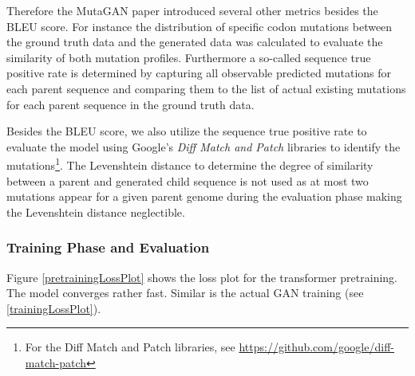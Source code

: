 Therefore the MutaGAN paper \cite{Berman2020} introduced several other metrics besides the \ac{BLEU} score. For instance the distribution of specific codon mutations between the ground truth data and the generated data was calculated to evaluate the similarity of both mutation profiles. Furthermore a so-called sequence true positive rate is determined by capturing all observable predicted mutations for each parent sequence and comparing them to the list of actual existing mutations for each parent sequence in the ground truth data. 

Besides the \ac{BLEU} score, we also utilize the sequence true positive rate to evaluate the model using Google's \textit{Diff Match and Patch} libraries to identify the mutations\footnote{For the Diff Match and Patch libraries, see \url{https://github.com/google/diff-match-patch}}. The Levenshtein distance to determine the degree of similarity between a parent and generated child sequence is not used as at most two mutations appear for a given parent genome during the evaluation phase making the Levenshtein distance neglectible. 

\subsubsection{Training Phase and Evaluation} \label{ch:experimentsBb}

Figure \ref{pretrainingLossPlot} shows the loss plot for the transformer pretraining. The model converges rather fast. Similar is the actual \ac{GAN} training (see \ref{trainingLossPlot}). 

